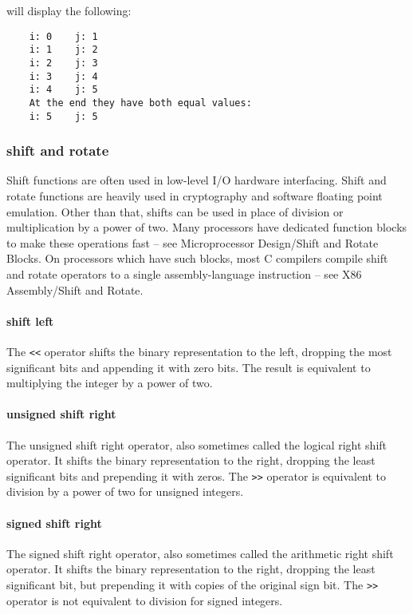 will display the following:

\begin{verbatim}
	i: 0    j: 1
	i: 1    j: 2
	i: 2    j: 3
	i: 3    j: 4
	i: 4    j: 5
	At the end they have both equal values:
	i: 5    j: 5
\end{verbatim}

\subsubsection{shift and rotate}
Shift functions are often used in low-level I/O hardware interfacing.  Shift
and rotate functions are heavily used in cryptography and software floating
point emulation.  Other than that, shifts can be used in place of division or
multiplication by a power of two.  Many processors have dedicated function
blocks to make these operations fast -- see Microprocessor Design/Shift and
Rotate Blocks. On processors which have such blocks, most C compilers compile
shift and rotate operators to a single assembly-language instruction -- see X86
Assembly/Shift and Rotate.

\paragraph{shift left}
The \texttt{\textless{}\textless{}} operator shifts the binary representation
to the left, dropping the most significant bits and appending it with zero
bits.  The result is equivalent to multiplying the integer by a power of two.

\paragraph{unsigned shift right}
The unsigned shift right operator, also sometimes called the logical right
shift operator.  It shifts the binary representation to the right, dropping the
least significant bits and prepending it with zeros.  The
\texttt{\textgreater{}\textgreater{}} operator is equivalent to division by a
power of two for unsigned integers.

\paragraph{signed shift right}
The signed shift right operator, also sometimes called the arithmetic right
shift operator.  It shifts the binary representation to the right, dropping the
least significant bit, but prepending it with copies of the original sign bit.
The \texttt{\textgreater{}\textgreater{}} operator is not equivalent to
division for signed integers.

